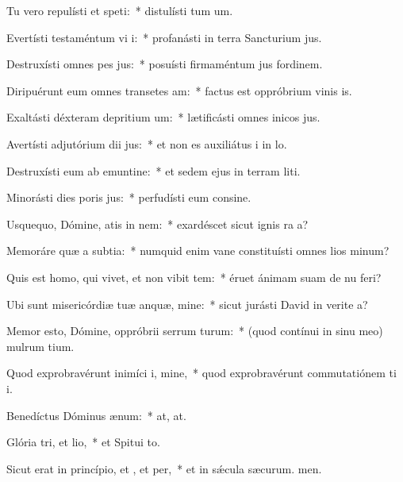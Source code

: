 \item Tu vero repulísti et speti:~* distulísti tum um.
\item Evertísti testaméntum vi i:~* profanásti in terra Sancturium jus.
\item Destruxísti omnes pes jus:~* posuísti firmaméntum jus fordinem.
\item Diripuérunt eum omnes transetes am:~* factus est oppróbrium vinis is.
\item Exaltásti déxteram depritium um:~* lætificásti omnes inicos jus.
\item Avertísti adjutórium dii jus:~* et non es auxiliátus i in lo.
\item Destruxísti eum ab emuntine:~* et sedem ejus in terram liti.
\item Minorásti dies poris jus:~* perfudísti eum consine.
\item Usquequo, Dómine, atis in nem:~* exardéscet sicut ignis ra a?
\item Memoráre quæ a subtia:~* numquid enim vane constituísti omnes lios minum?
\item Quis est homo, qui vivet, et non vibit tem:~* éruet ánimam suam de nu feri?
\item Ubi sunt misericórdiæ tuæ anquæ, mine:~* sicut jurásti David in verite a?
\item Memor esto, Dómine, oppróbrii serrum turum:~* (quod contínui in sinu meo) mulrum tium.
\item Quod exprobravérunt inimíci i, mine,~* quod exprobravérunt commutatiónem ti i.
\item Benedíctus Dóminus  ænum:~* at, at.
\item Glória tri, et lio,~* et Spitui to.
\item Sicut erat in princípio, et , et per,~* et in sǽcula sæcurum. men.
